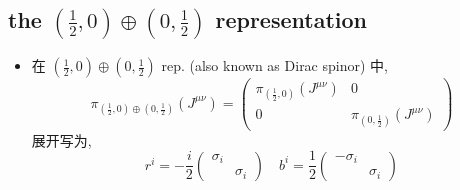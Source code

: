 \subsection{the \texorpdfstring{$(\frac{1}{2}, 0) \oplus (0, \frac{1}{2})$}{(1/2, 0)+(0, 1/2)} representation}
\begin{itemize}
	\item 在 $(\frac{1}{2}, 0) \oplus (0, \frac{1}{2})$ rep. (also known as Dirac spinor) 中,
	\begin{equation}
		\pi_{(\frac{1}{2}, 0) \oplus (0, \frac{1}{2})}(J^{\mu \nu}) = \begin{pmatrix}
			\pi_{(\frac{1}{2}, 0)}(J^{\mu \nu}) & 0 \\
			0 & \pi_{(0, \frac{1}{2})}(J^{\mu \nu})
		\end{pmatrix}
	\end{equation}
	展开写为,
	\begin{equation}
		r^i = - \frac{i}{2} \begin{pmatrix}
			\sigma_i & \\
			& \sigma_i
		\end{pmatrix} \quad b^i = \frac{1}{2} \begin{pmatrix}
			- \sigma_i & \\
			& \sigma_i
		\end{pmatrix}
	\end{equation}
\end{itemize}

